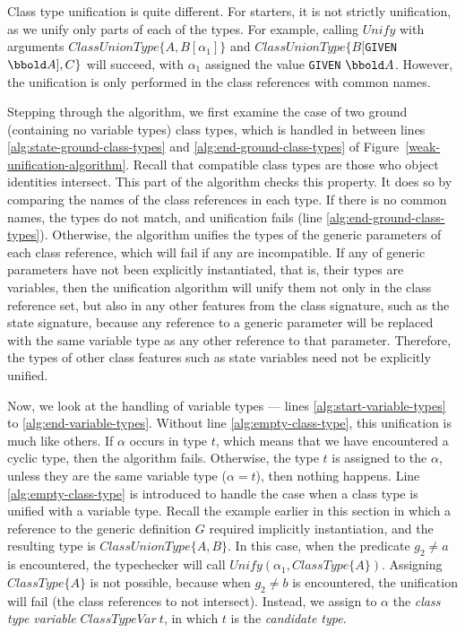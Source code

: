 Class type unification is quite different. For starters, it is not
strictly unification, as we unify only parts of each of the types. For
example, calling $Unify$ with arguments $ClassUnionType \{A,
B[\alpha_1]\}$ and $ClassUnionType \{B[${\tt GIVEN} $\arithmos], C\}$
will succeed, with $\alpha_1$ assigned the value {\tt GIVEN}
$\arithmos$. However, the unification is only performed in the class
references with common names.

Stepping through the algorithm, we first examine the case of two
ground (containing no variable types) class types, which is handled in
between lines \ref{alg:state-ground-class-types} and
\ref{alg:end-ground-class-types} of
Figure~\ref{weak-unification-algorithm}. Recall that compatible class
types are those who object identities intersect. This part of the
algorithm checks this property. It does so by comparing the names of
the class references in each type. If there is no common names, the
types do not match, and unification fails (line
\ref{alg:end-ground-class-types}). Otherwise, the algorithm unifies
the types of the generic parameters of each class reference, which
will fail if any are incompatible. If any of generic parameters have
not been explicitly instantiated, that is, their types are variables,
then the unification algorithm will unify them not only in the class
reference set, but also in any other features from the class
signature, such as the state signature, because any reference to a
generic parameter will be replaced with the same variable type as any
other reference to that parameter. Therefore, the types of other class
features such as state variables need not be explicitly unified.

Now, we look at the handling of variable types --- lines
\ref{alg:start-variable-types} to
\ref{alg:end-variable-types}. Without line \ref{alg:empty-class-type},
this unification is much like others. If $\alpha$ occurs in type $t$,
which means that we have encountered a cyclic type, then the algorithm
fails. Otherwise, the type $t$ is assigned to the $\alpha$, unless
they are the same variable type ($\alpha = t$), then nothing
happens. Line \ref{alg:empty-class-type} is introduced to handle the case when
a class type is unified with a variable type. Recall the example
earlier in this section in
which a reference to the generic definition $G$ required implicitly
instantiation, and the resulting type is $ClassUnionType \{A, B\}$. In this case,
when the predicate $g_2 \neq a$ is encountered, the typechecker will
call $Unify(\alpha_1, ClassType\{A\})$. Assigning $ClassType\{A\}$ is
not possible, because when $g_2 \neq b$ is encountered, the
unification will fail (the class references to not
intersect). Instead, we assign to $\alpha$ the {\em class type
  variable} $ClassTypeVar~t$, in which $t$ is the {\em candidate
  type}. 

